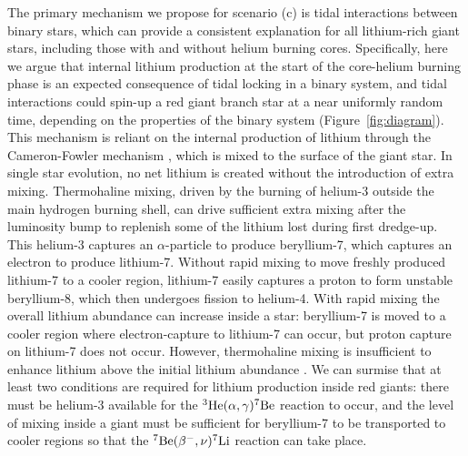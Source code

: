 \documentclass[twocolumn]{aastex62}
\begin{document}
The primary mechanism we propose for scenario (c) is tidal interactions between binary stars,
which can provide a consistent explanation for all
lithium-rich giant stars, including those with and without helium burning cores. 
Specifically, here we argue that internal lithium production at the start of the core-helium burning phase 
is an expected consequence of tidal locking in a binary system,
and tidal interactions could spin-up a red giant branch star at a near uniformly random time, depending on the properties of the binary system (Figure~\ref{fig:diagram}).
This mechanism is reliant on the internal production of lithium 
through the Cameron-Fowler mechanism \citep{Cameron_1971}, 
which is mixed to the surface of the giant star. In single star evolution, no net lithium is created without the introduction of extra
mixing.  Thermohaline mixing, driven by the burning of helium-3 outside the main hydrogen burning shell, can drive sufficient extra mixing after the luminosity bump to replenish some of the lithium lost during first dredge-up. This helium-3 captures an $\alpha$-particle to produce 
beryllium-7, which captures an electron to produce lithium-7. Without rapid mixing to move 
freshly  produced lithium-7 to a cooler region, lithium-7 easily captures a proton to 
form unstable beryllium-8, which then undergoes fission to helium-4. With rapid mixing 
the overall lithium abundance can increase inside a star: beryllium-7 is moved to a 
cooler region where electron-capture to lithium-7 can occur, but proton capture on 
lithium-7 does not occur. However, thermohaline mixing is insufficient to enhance lithium above the initial lithium abundance \citep{Lattanzio_2014}.
We can surmise that at least two conditions are required for lithium production inside red giants: there must be helium-3 available for the $^3{\rm He}(\alpha,\gamma)^7{\rm Be}$ reaction to occur, and the level of mixing inside a giant must be sufficient for beryllium-7 to be transported to cooler regions so that the $^7{\rm Be}(\beta^{-},\nu)^7{\rm Li}$ reaction can take place. 
\end{document}
